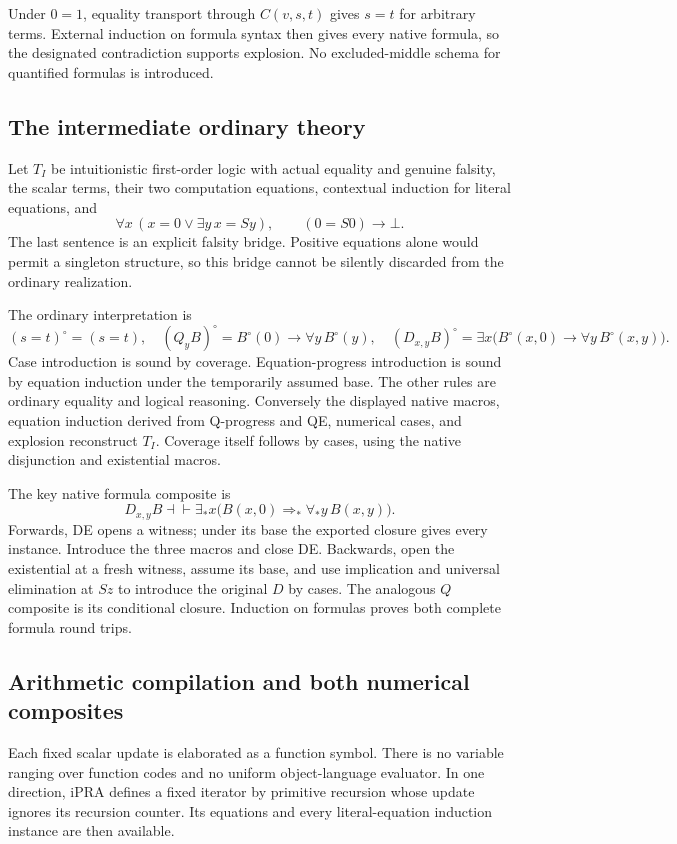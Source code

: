 \documentclass[11pt,letterpaper]{article}
\theoremstyle{definition}
\theoremstyle{remark}
\begin{document}
Under $0=1$, equality transport through $C(v,s,t)$ gives $s=t$ for
arbitrary terms. External induction on formula syntax then gives
every native formula, so the designated contradiction supports explosion.
No excluded-middle schema for quantified formulas is introduced.

\subsection{The intermediate ordinary theory}

Let $T_I$ be intuitionistic first-order logic with actual equality and
genuine falsity, the scalar terms, their two computation equations,
contextual induction for literal equations, and
\[
 \forall x\,(x=0\vee\exists y\,x=Sy),
 \qquad (0=S0)\to\bot.
\]
The last sentence is an explicit falsity bridge. Positive equations alone
would permit a singleton structure, so this bridge cannot be silently
discarded from the ordinary realization.

The ordinary interpretation is
\[
 (s=t)^\circ=(s=t),\quad
 (Q_yB)^\circ=B^\circ(0)\to\forall y\,B^\circ(y),\quad
 (D_{x,y}B)^\circ=
 \exists x\bigl(B^\circ(x,0)\to\forall y\,B^\circ(x,y)\bigr).
\]
Case introduction is sound by coverage. Equation-progress introduction
is sound by equation induction under the temporarily assumed base.
The other rules are ordinary equality and logical reasoning.
Conversely the displayed native macros, equation induction derived
from Q-progress and QE, numerical cases, and explosion reconstruct
$T_I$. Coverage itself follows by cases, using the native disjunction
and existential macros.

The key native formula composite is
\[
 D_{x,y}B
 \dashv\vdash
 \exists_*x\bigl(B(x,0)\Rightarrow_*\forall_*y\,B(x,y)\bigr).
\]
Forwards, DE opens a witness; under its base the exported closure
gives every instance. Introduce the three macros and close DE.
Backwards, open the existential at a fresh witness, assume its base,
and use implication and universal elimination at $Sz$ to introduce
the original $D$ by cases. The analogous $Q$ composite is its conditional
closure. Induction on formulas proves both complete formula round trips.

\subsection{Arithmetic compilation and both numerical composites}

Each fixed scalar update is elaborated as a function symbol.
There is no variable ranging over function codes and no uniform
object-language evaluator. In one direction, iPRA defines a fixed
iterator by primitive recursion whose update ignores its recursion
counter. Its equations and every literal-equation induction instance
are then available.
\end{document}
